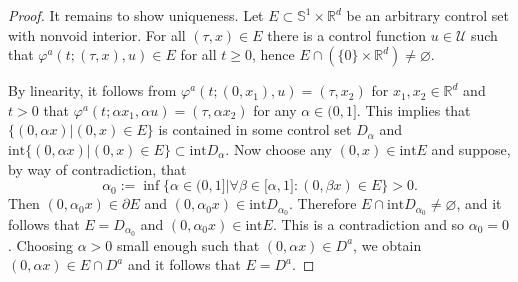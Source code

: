 \documentclass[10pt,a4paper]{amsart}
\begin{document}
\begin{proof}
It remains to show uniqueness. Let $E\subset\mathbb{S}^{1}\times\mathbb{R}%
^{d}$ be an arbitrary control set with nonvoid interior. For all $(\tau,x)\in
E$ there is a control function $u\in\mathcal{U}$ such that $\varphi
^{a}(t;(\tau,x),u)\in E$ for all $t\geq0$, hence $E\cap\left(  \{0\}\times
\mathbb{R}^{d}\right)  \not =\varnothing$.

By linearity, it follows from $\varphi^{a}(t;(0,x_{1}),u)=(\tau,x_{2})$ for
$x_{1},x_{2}\in\mathbb{R}^{d}$ and $t>0$ that $\varphi^{a}(t;\alpha
x_{1},\alpha u)=(\tau,\alpha x_{2})$ for any $\alpha\in(0,1]$. This implies
that $\{(0,\alpha x)\left\vert (0,x)\in E\right.  \}$ is contained in some
control set $D_{\alpha}$ and $\mathrm{int}\{(0,\alpha x)\left\vert (0,x)\in
E\right.  \}\subset\mathrm{int}D_{\alpha}$. Now choose any $(0,x)\in
\mathrm{int}E$ and suppose, by way of contradiction, that
\[
\alpha_{0}:=\inf\{\alpha\in(0,1]\left\vert \forall\beta\in\lbrack
\alpha,1]:(0,\beta x)\in E\right.  \}>0.
\]
Then $(0,\alpha_{0}x)\in\partial E$ and $(0,\alpha_{0}x)\in\mathrm{int}%
D_{\alpha_{0}}$. Therefore $E\cap\mathrm{int}D_{\alpha_{0}}\not =\varnothing$,
and it follows that $E=D_{\alpha_{0}}$ and $(0,\alpha_{0}x)\in\mathrm{int}E$.
This is a contradiction and so $\alpha_{0}=0$. Choosing $\alpha>0$ small
enough such that $(0,\alpha x)\in D^{a}$, we obtain $(0,\alpha x)\in E\cap
D^{a}$ and it follows that $E=D^{a}$.
\end{proof}
\end{document}
